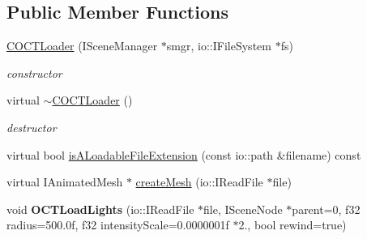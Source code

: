 \subsection*{Public Member Functions}
\begin{DoxyCompactItemize}
\item 
\hypertarget{classirr_1_1scene_1_1_c_o_c_t_loader_a725b2178d57e691fb3401aafcd207d4a}{\hyperlink{classirr_1_1scene_1_1_c_o_c_t_loader_a725b2178d57e691fb3401aafcd207d4a}{C\-O\-C\-T\-Loader} (I\-Scene\-Manager $\ast$smgr, io\-::\-I\-File\-System $\ast$fs)}\label{classirr_1_1scene_1_1_c_o_c_t_loader_a725b2178d57e691fb3401aafcd207d4a}

\begin{DoxyCompactList}\small\item\em constructor \end{DoxyCompactList}\item 
\hypertarget{classirr_1_1scene_1_1_c_o_c_t_loader_a9e9dc73b5141556e9262328a8714ec5b}{virtual \hyperlink{classirr_1_1scene_1_1_c_o_c_t_loader_a9e9dc73b5141556e9262328a8714ec5b}{$\sim$\-C\-O\-C\-T\-Loader} ()}\label{classirr_1_1scene_1_1_c_o_c_t_loader_a9e9dc73b5141556e9262328a8714ec5b}

\begin{DoxyCompactList}\small\item\em destructor \end{DoxyCompactList}\item 
virtual bool \hyperlink{classirr_1_1scene_1_1_c_o_c_t_loader_ac9613156c3bc56002c904973de74cbe8}{is\-A\-Loadable\-File\-Extension} (const io\-::path \&filename) const 
\item 
virtual I\-Animated\-Mesh $\ast$ \hyperlink{classirr_1_1scene_1_1_c_o_c_t_loader_af8c8c8ddcaead7c525c1cbcca5ed0628}{create\-Mesh} (io\-::\-I\-Read\-File $\ast$file)
\item 
\hypertarget{classirr_1_1scene_1_1_c_o_c_t_loader_af301702ec34cfff40ae99c671179167d}{void {\bfseries O\-C\-T\-Load\-Lights} (io\-::\-I\-Read\-File $\ast$file, I\-Scene\-Node $\ast$parent=0, f32 radius=500.\-0f, f32 intensity\-Scale=0.\-0000001f $\ast$2., bool rewind=true)}\label{classirr_1_1scene_1_1_c_o_c_t_loader_af301702ec34cfff40ae99c671179167d}

\end{DoxyCompactItemize}


